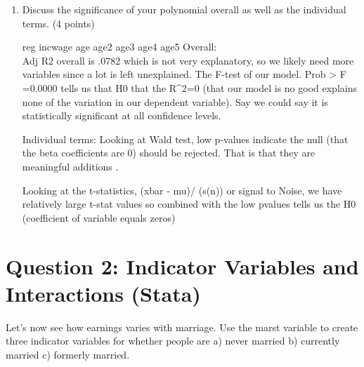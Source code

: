 \documentclass{article}
\begin{document}
\begin{enumerate}[label=\alph*]
\begin{table}[tbp]
\begin{tabularx}{\textwidth}{lCCCC}
	\end{tabularx}
\end{table}


\item  Discuss the significance of your polynomial overall as well as the individual terms.  (4 points)

reg incwage age age2 age3 age4 age5 Overall: \\

Adj R2 overall is .0782 which is not very explanatory, so we likely need more variables since a lot is left unexplained.
The F-test of our model. Prob > F =0.0000 tells us that H0 that the R^2=0 (that our model is no good explains
none of the variation in our dependent variable). Say we could say it is statistically significant at all confidence levels.

Individual terms: Looking at Wald test, low p-values indicate 
the null (that the beta coefficients are 0) should be rejected. That is that 
they are meaningful additions .

Looking at the t-statistics, (xbar - mu)/ (s\sqrt(n)) or signal to Noise, we have 
relatively large t-stat values so combined with the low pvalues tells us the H0 
(coefficient of variable equals zeros)



\end{enumerate}

\section{Question 2:  Indicator Variables and Interactions  (Stata)}
Let’s now see how earnings varies with marriage. Use the marst variable to create
three indicator variables for whether people are a) never married b) currently married c) formerly married.
\end{document}
